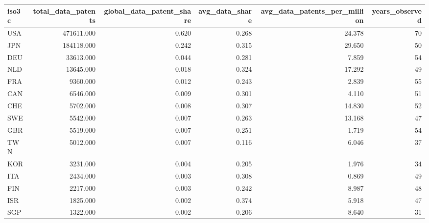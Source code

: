 \begin{tabular}{lrrrrr}
\toprule
iso3c & total_data_patents & global_data_patent_share & avg_data_share & avg_data_patents_per_million & years_observed \\
\midrule
USA & 471611.000 & 0.620 & 0.268 & 24.378 & 70 \\
JPN & 184118.000 & 0.242 & 0.315 & 29.650 & 50 \\
DEU & 33613.000 & 0.044 & 0.281 & 7.859 & 54 \\
NLD & 13645.000 & 0.018 & 0.324 & 17.292 & 49 \\
FRA & 9360.000 & 0.012 & 0.243 & 2.839 & 55 \\
CAN & 6546.000 & 0.009 & 0.301 & 4.110 & 51 \\
CHE & 5702.000 & 0.008 & 0.307 & 14.830 & 52 \\
SWE & 5542.000 & 0.007 & 0.263 & 13.168 & 47 \\
GBR & 5519.000 & 0.007 & 0.251 & 1.719 & 54 \\
TWN & 5012.000 & 0.007 & 0.116 & 6.046 & 37 \\
KOR & 3231.000 & 0.004 & 0.205 & 1.976 & 34 \\
ITA & 2434.000 & 0.003 & 0.308 & 0.869 & 49 \\
FIN & 2217.000 & 0.003 & 0.242 & 8.987 & 48 \\
ISR & 1825.000 & 0.002 & 0.374 & 5.918 & 47 \\
SGP & 1322.000 & 0.002 & 0.206 & 8.640 & 31 \\
\bottomrule
\end{tabular}

